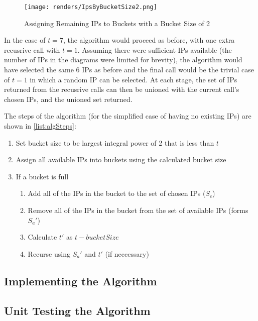 \begin{figure}[H]
      \centering
      \texttt{[image: renders/IpsByBucketSize2.png]}
      \caption{Assigning Remaining IPs to Buckets with a Bucket Size of 2}
      \label{fig:exampleIpsByBucket2}
\end{figure}

In the case of $t = 7$, the algorithm would proceed as before, with one extra recusrive call with $t = 1$. Assuming there were sufficient IPs available (the number of IPs in the diagrams were limited for brevity), the algorithm would have selected the same 6 IPs as before and the final call would be the trivial case of $t = 1$ in which a random IP can be selected. At each stage, the set of IPs returned from the recusrive calls can then be unioned with the current call's chosen IPs, and the unioned set returned. 

The steps of the algorithm (for the simplified case of having no existing IPs) are shown in \ref{list:algSteps}:
\begin{enumerate}\label{list:algSteps}
\item{Set bucket size to be largest integral power of 2 that is less than $t$}
\item{Assign all available IPs into buckets using the calculated bucket size}
\item{If a bucket is full}
  \begin{enumerate}
  \item{Add all of the IPs in the bucket to the set of chosen IPs ($S_c$)}
  \item{Remove all of the IPs in the bucket from the set of available IPs (forms $S_a'$)}
  \item{Calculate $t'$ as $t - bucketSize$}
  \item{Recurse using $S_a'$ and $t'$ (if neccessary)}
  \end{enumerate}
\end{enumerate}

\subsection{Implementing the Algorithm}
\subsection{Unit Testing the Algorithm}

